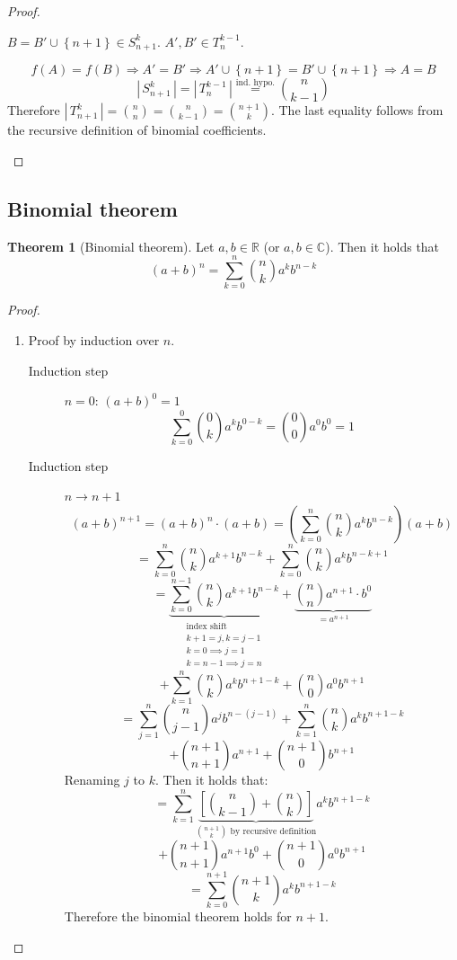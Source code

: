 \documentclass[a4paper,landscape,twocolumn]{article}
\theoremstyle{definition}
\newtheorem{theorem}{Theorem}
\newcommand\set[1]{\left\{#1\right\}}
\newcommand\card[1]{\left|\,#1\,\right|}
\begin{document}
\begin{proof}
\begin{description}
      $B = B' \cup \set{n+1} \in S_{n+1}^k$. $A', B' \in T_n^{k-1}$.

      \[ f(A) = f(B) \Rightarrow A' = B' \Rightarrow A' \cup \set{n+1} = B' \cup \set{n+1} \Rightarrow A = B \]
      \[ \card{S_{n+1}^k} = \card{T_n^{k-1}} \stackrel{\text{ind. hypo.}}{=} \binom{n}{k-1} \]
      Therefore $\card{T_{n+1}^k} = \binom nn = \binom n{k-1} = \binom{n+1}{k}$.
      The last equality follows from the recursive definition of binomial coefficients.
  \end{description}
\end{proof}

\subsection{Binomial theorem}
\begin{theorem}[Binomial theorem]
  Let $a, b \in \mathbb{R}$ (or $a, b \in \mathbb{C}$). Then it holds that
  \[ (a + b)^n = \sum_{k=0}^n \binom{n}{k} a^k b^{n-k} \]
\end{theorem}

\begin{proof}
  \begin{enumerate}
    \item
      Proof by induction over $n$.
      \begin{description}
        \item[Induction step] $n=0$: $(a + b)^0 = 1$
          \[ \sum_{k=0}^0 \binom{0}{k} a^k b^{0-k} = \binom{0}{0} a^0 b^0 = 1 \]
        \item[Induction step] $n \rightarrow n + 1$
          \[
            (a + b)^{n+1} = (a + b)^n \cdot (a + b)
            = \left(\sum_{k=0}^n \binom nk a^k b^{n-k}\right) (a + b)
          \] \[
            = \sum_{k=0}^n \binom nk a^{k+1} b^{n-k} + \sum_{k=0}^n \binom nk a^k b^{n-k+1}
          \] \[
            = \underbrace{\sum_{k=0}^{n-1} \binom nk a^{k+1} b^{n-k}}_{\substack{\text{index shift} \\ k+1=j, k=j-1 \\ k=0 \implies j=1 \\ k=n-1 \implies j=n}} +
              \underbrace{\binom nn a^{n+1} \cdot b^0}_{= a^{n+1}}
          \] \[
            + \sum_{k=1}^n \binom nk a^k b^{n+1-k} +
              \binom n0 a^0 b^{n+1}
          \] \[
            = \sum_{j=1}^n \binom{n}{j-1} a^j b^{n-(j-1)}
            + \sum_{k=1}^n \binom nk a^k b^{n+1-k}
          \] \[
            + \binom{n+1}{n+1} a^{n+1}
            + \binom{n+1}{0} b^{n+1}
          \]
          Renaming $j$ to $k$. Then it holds that:
          \[
            = \sum_{k=1}^n \underbrace{\left[\binom{n}{k-1} + \binom nk\right]}_{\binom{n+1}{k} \text{ by recursive definition}} a^k b^{n+1-k}
          \] \[
            + \binom{n+1}{n+1} a^{n+1} b^0
            + \binom{n+1}{0} a^0 b^{n+1}
          \] \[
            = \sum_{k=0}^{n+1} \binom{n+1}{k} a^k b^{n+1-k}
          \]
          Therefore the binomial theorem holds for $n+1$.
      \end{description}
  \end{enumerate}
\end{proof}
\end{document}
